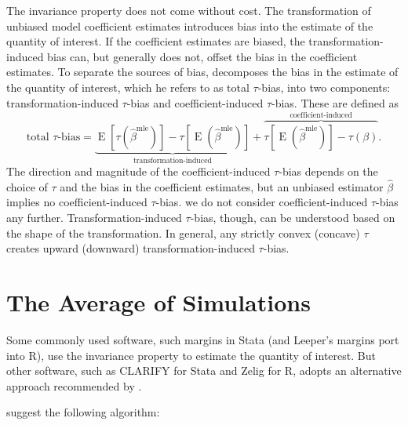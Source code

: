 \documentclass[10pt]{article}
\DeclareMathOperator*{\E}{\text{E}}
\begin{document}
The invariance property does not come without cost. 
The transformation of unbiased model coefficient estimates introduces bias into the estimate of the quantity of interest. 
If the coefficient estimates are biased, the transformation-induced bias can, but generally does not, offset the bias in the coefficient estimates. 
To separate the sources of bias, \citet[p. 404]{Rainey2017} decomposes the bias in the estimate of the quantity of interest, which he refers to as total $\tau$-bias, into two components: transformation-induced $\tau$-bias and coefficient-induced $\tau$-bias. These are defined as
\begin{equation}
\text{total } \tau\text{-bias}= \underbrace{ \E[\tau(\hat{\beta}^\text{mle})]-  \tau[\E(\hat{\beta}^\text{mle})]  }_{\text{transformation-induced}} + \overbrace{  \tau[\E(\hat{\beta}^\text{mle})] - \tau(\beta)  }^{\text{coefficient-induced}}\text{.} \label{eqn:ti-bias}
\end{equation}
The direction and magnitude of the coefficient-induced $\tau$-bias depends on the choice of $\tau$ and the bias in the coefficient estimates, but an unbiased estimator $\hat{\beta}$ implies no coefficient-induced $\tau$-bias.
we do not consider coefficient-induced $\tau$-bias any further. 
Transformation-induced $\tau$-bias, though, can be understood based on the shape of the transformation. 
In general, any strictly convex (concave) $\tau$ creates upward (downward) transformation-induced $\tau$-bias. 

\section*{The Average of Simulations}

Some commonly used software, such margins in Stata (and Leeper's margins port into R), use the invariance property to estimate the quantity of interest. 
But other software, such as CLARIFY for Stata and Zelig for R, adopts an alternative approach recommended by \cite{KingTomzWittenberg2000}. 

\cite{KingTomzWittenberg2000} suggest the following algorithm: 
\end{document}
